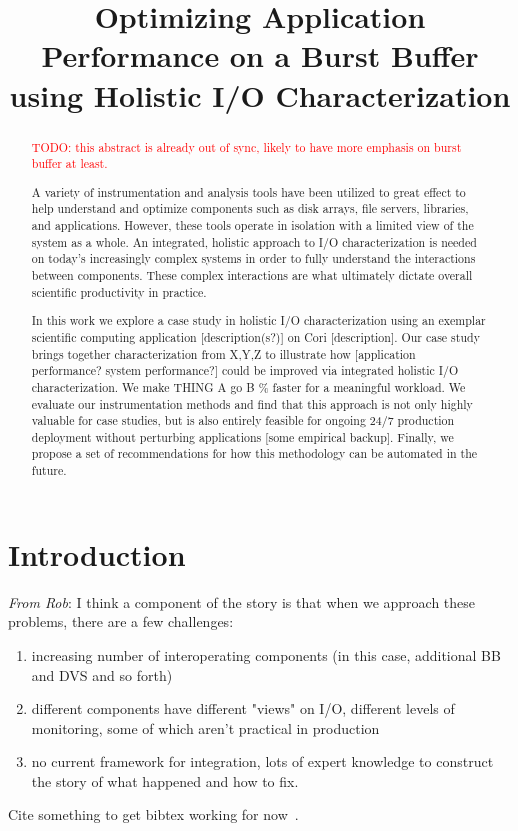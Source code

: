 \documentclass[conference,10pt,compsocconf]{IEEEtran}
\begin{document}
\title{Optimizing Application Performance on a Burst Buffer using
Holistic I/O Characterization}

\maketitle

\begin{abstract}

\textcolor{red}{TODO: this abstract is already out of sync, likely to have
more emphasis on burst buffer at least.}

A variety of instrumentation and analysis tools have been utilized to
great effect to help understand and optimize components such as disk
arrays, file servers, libraries, and applications.  However, these
tools operate in isolation with a limited view of the system as a whole.
An integrated, holistic approach to I/O characterization is needed on
today's increasingly complex systems in order to fully understand
the interactions between components.  These complex interactions are what 
ultimately dictate overall scientific productivity in practice.

In this work we explore a case study in holistic I/O characterization
using an exemplar scientific computing application [description(s?)] on
Cori [description].  Our case study brings together characterization from
X,Y,Z to illustrate how [application performance?  system performance?]
could be improved via integrated holistic I/O characterization.
We make THING A go B \% faster for a meaningful workload.  We evaluate
our instrumentation methods and find that this approach is not only
highly valuable for case studies, but is also entirely feasible for
ongoing 24/7 production deployment without perturbing applications [some
empirical backup].  Finally, we propose a set of recommendations for
how this methodology can be automated in the future.

\end{abstract}

\section{Introduction}

\emph{From Rob}: I think a component of the story is that when we approach these problems, there are a few challenges:
\begin{enumerate}
\item increasing number of interoperating components (in this case, additional
BB and DVS and so forth)
\item different components have different "views" on I/O, different levels of
monitoring, some of which aren't practical in production
\item no current framework for integration, lots of expert knowledge to
construct the story of what happened and how to fix.
\end{enumerate}
Cite something to get bibtex working for now~\cite{carns200924}.
\end{document}
